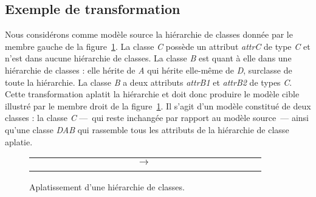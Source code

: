 \subsection{Exemple de transformation}
\label{flattening:subsec:model}

Nous considérons comme modèle source la hiérarchie de classes donnée par le
membre gauche de la figure~\ref{fig:transfohierarchieclasses}. La classe
\emph{C} possède un attribut \emph{attrC} de type \emph{C} et n'est dans aucune
hiérarchie de classes. La classe \emph{B} est quant à elle dans une hiérarchie
de classes : elle hérite de \emph{A} qui hérite elle-même de \emph{D},
surclasse de toute la hiérarchie. La classe \emph{B} a deux attributs
\emph{attrB1} et \emph{attrB2} de types \emph{C}. Cette transformation aplatit
la hiérarchie et doit donc produire le modèle cible illustré par le membre
droit de la figure~\ref{fig:transfohierarchieclasses}. Il s'agit d'un modèle
constitué de deux classes : la classe \emph{C} ---~qui reste inchangée par
rapport au modèle source~--- ainsi qu'une classe \emph{DAB} qui rassemble tous
les attributs de la hiérarchie de classe aplatie. 



%    
%
%    

\begin{figure}[h]
  \begin{center}
  \begin{tabular}{m{0.4\linewidth}m{0.1\linewidth}m{0.4\linewidth}}
     & \textbf{$\longrightarrow$} &
    \\
    \centering{(a)} && \centering{(b)}\\
    \end{tabular}
    \caption{Aplatissement d'une hiérarchie de classes.}
    \label{fig:transfohierarchieclasses}
  \end{center}
\end{figure}

